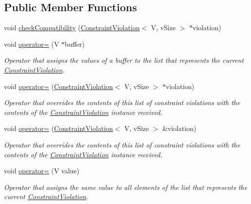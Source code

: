 \subsection*{Public Member Functions}
\begin{DoxyCompactItemize}
\item 
void \hyperlink{structConstraintViolation_a82ebcbfe61ca8adcf6f7b613c4c69f8d}{check\+Compatibility} (\hyperlink{structConstraintViolation}{Constraint\+Violation}$<$ V, v\+Size $>$ $\ast$violation)
\item 
void \hyperlink{structConstraintViolation_a2bfd655f35c83bb9ef8b01102163f519}{operator=} (V $\ast$buffer)
\begin{DoxyCompactList}\small\item\em Operator that assigns the values of a buffer to the list that represents the current \hyperlink{structConstraintViolation}{Constraint\+Violation}. \end{DoxyCompactList}\item 
void \hyperlink{structConstraintViolation_aab52761d8cbde42604d5539d90990876}{operator=} (\hyperlink{structConstraintViolation}{Constraint\+Violation}$<$ V, v\+Size $>$ $\ast$violation)
\begin{DoxyCompactList}\small\item\em Operator that overrides the contents of this list of constraint violations with the contents of the \hyperlink{structConstraintViolation}{Constraint\+Violation} instance received. \end{DoxyCompactList}\item 
void \hyperlink{structConstraintViolation_a303559f871c792bbf9611b64e48918b9}{operator=} (\hyperlink{structConstraintViolation}{Constraint\+Violation}$<$ V, v\+Size $>$ \&violation)
\begin{DoxyCompactList}\small\item\em Operator that overrides the contents of this list of constraint violations with the contents of the \hyperlink{structConstraintViolation}{Constraint\+Violation} instance received. \end{DoxyCompactList}\item 
void \hyperlink{structConstraintViolation_ade5d301bab412f21e9d1e0483af19412}{operator=} (V value)
\begin{DoxyCompactList}\small\item\em Operator that assigns the same value to all elements of the list that represents the current \hyperlink{structConstraintViolation}{Constraint\+Violation}. \end{DoxyCompactList}\item 

\end{DoxyCompactItemize}
